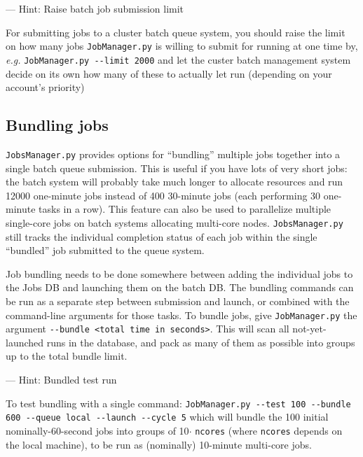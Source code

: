 \documentclass[12pt,english]{article}
\newenvironment{hint}[1][{}]{
\definecolor{shadecolor}{rgb}{.9,.9,.9}
\begin{shaded}
{\color{purple}--- Hint: #1}

}{\end{shaded}}
\newcommand{\cd}[1]{\texorpdfstring{{\color{blue} \texttt{#1}}}{#1}}
\newcommand{\eg}{{\em e.g.}}
\begin{document}
\begin{hint}[Raise batch job submission limit]
For submitting jobs to a cluster batch queue system, you should raise the limit on how many jobs
    \cd{JobManager.py} is willing to submit for running at one time by, \eg\newline
\cd{JobManager.py {-}{-}limit 2000} \newline
and let the custer batch management system decide on its own how many of these
    to actually let run (depending on your account's priority)
\end{hint}

\subsection{Bundling jobs}

\cd{JobsManager.py} provides options for ``bundling'' multiple jobs together into a single batch queue submission.
This is useful if you have lots of very short jobs:
    the batch system will probably take much longer to allocate resources and run 12000 one-minute jobs instead of
    400 30-minute jobs (each performing 30 one-minute tasks in a row).
This feature can also be used to parallelize multiple single-core jobs on batch systems
    allocating multi-core nodes.
\cd{JobsManager.py} still tracks the individual completion status of each job within the
    single ``bundled'' job submitted to the queue system.

Job bundling needs to be done somewhere between adding the individual jobs to the Jobs DB
    and launching them on the batch DB.
The bundling commands can be run as a separate step between submission and launch,
    or combined with the command-line arguments for those tasks.
To bundle jobs, give \cd{JobManager.py} the argument \cd{{-}{-}bundle <total time in seconds>}.
This will scan all not-yet-launched runs in the database, and pack as many of them as possible
    into groups up to the total bundle limit.

\begin{hint}[Bundled test run]
To test bundling with a single command: \newline
\cd{JobManager.py {-}{-}test 100 {-}{-}bundle 600 {-}{-}queue local {-}{-}launch {-}{-}cycle 5} \newline
which will bundle the 100 initial nominally-60-second jobs into groups of 10$\cdot$\cd{ncores}
    (where \cd{ncores} depends on the local machine), to be run as (nominally) 10-minute multi-core jobs.
\end{hint}
\end{document}
